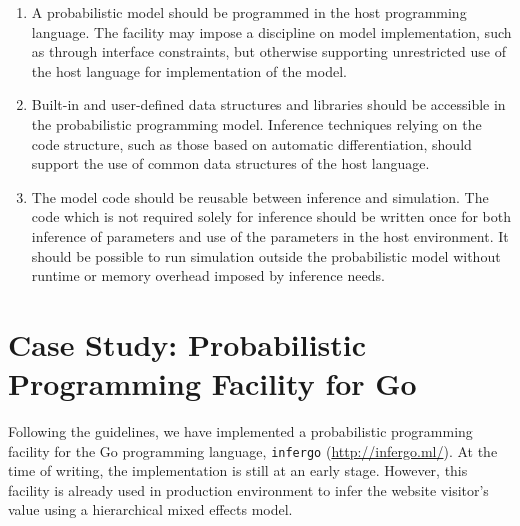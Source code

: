 \documentclass[sigplan,review]{acmart}\settopmatter{printfolios=true,printccs=false,printacmref=false}
\begin{document}
\begin{enumerate}
\item A probabilistic model should be programmed in the host
programming language. The facility may impose a discipline on
model implementation, such as through interface constraints, but
otherwise supporting unrestricted use of the host language for
implementation of the model.

\item Built-in and user-defined data structures and libraries
should be accessible in the probabilistic programming model.
Inference techniques relying on the code structure, such as
those based on automatic differentiation, should support the
use of common data structures of the host language.

\item The model code should be reusable between inference and
simulation. The code which is not required solely for inference
should be written once for both inference of parameters and use
of the parameters in the host environment.  It should be
possible to run simulation outside the probabilistic model without
runtime or memory overhead imposed by inference needs.
\end{enumerate}

\section{Case Study: Probabilistic Programming Facility for
Go}

Following the guidelines, we have implemented a probabilistic
programming facility for the Go programming language,
\texttt{infergo} (\url{http://infergo.ml/}). At the time of
writing, the implementation is still at an early stage. However,
this facility is already used in production environment to infer
the website visitor's value using a hierarchical mixed effects
model.


\end{document}
